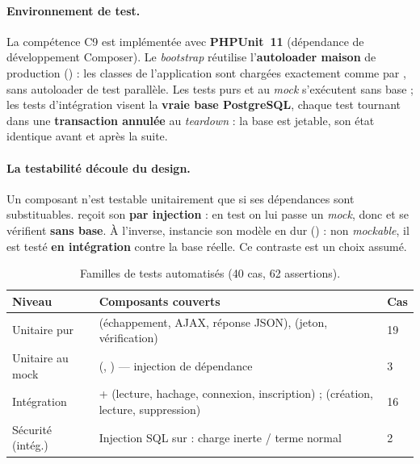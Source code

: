 \paragraph{Environnement de test.} La compétence C9 est implémentée avec \textbf{PHPUnit~11}
(dépendance de développement Composer). Le \emph{bootstrap}  réutilise
l'\textbf{autoloader maison} de production () : les classes de
l'application sont chargées exactement comme par , sans autoloader de test
parallèle. Les tests purs et au \emph{mock} s'exécutent sans base ; les tests d'intégration
visent la \textbf{vraie base PostgreSQL}, chaque test tournant dans une \textbf{transaction
annulée} au \emph{teardown} : la base est jetable, son état identique avant et après la suite.

\paragraph{La testabilité découle du design.} Un composant n'est testable unitairement que si
ses dépendances sont substituables.  reçoit son  \textbf{par
injection} : en test on lui passe un \emph{mock}, donc  et  se
vérifient \textbf{sans base}. À l'inverse,  instancie son modèle en dur
() : non \emph{mockable}, il est testé \textbf{en intégration} contre la
base réelle. Ce contraste est un choix assumé.

\begin{table}[H]
\centering
\renewcommand{\arraystretch}{1.3}
\small
\begin{tabularx}{\textwidth}{@{}L{3.4cm} X C{1.2cm}@{}}
\toprule
\textbf{Niveau} & \textbf{Composants couverts} & \textbf{Cas} \\
\midrule
Unitaire pur &  (échappement, AJAX, réponse JSON),  (jeton, vérification) & 19 \\
Unitaire au mock &  (, ) — injection de dépendance & 3 \\
Intégration &  +  (lecture, hachage, connexion, inscription) ;  (création, lecture, suppression) & 16 \\
Sécurité (intég.) & Injection SQL sur  : charge inerte / terme normal & 2 \\
\bottomrule
\end{tabularx}
\caption{Familles de tests automatisés (40 cas, 62 assertions).}
\label{tab:familles-tests}
\end{table}

